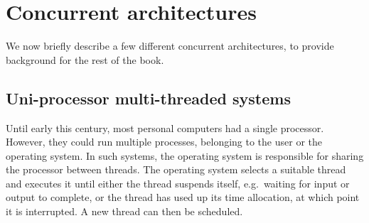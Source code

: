 
\section{Concurrent architectures}

We now briefly describe a few different concurrent architectures, to provide
background for the rest of the book.


\subsection{Uni-processor multi-threaded systems}

Until early this century, most personal computers had a single processor.
However, they could run multiple processes, belonging to the user or the
operating system.
%
In such systems, the operating system is responsible for sharing the processor
between threads.  The operating system selects a suitable thread and executes
it until either the thread suspends itself, e.g.~waiting for input or output
to complete, or the thread has used up its time allocation, at which point it
is interrupted.  A new thread can then be scheduled.


